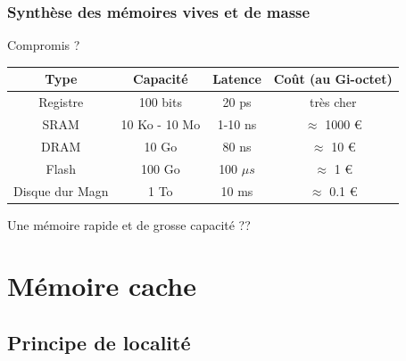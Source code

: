 \documentclass{beamer}
\begin{document}


\begin{frame}
\frametitle{Synthèse des mémoires vives et de masse}
\begin{block}{Compromis ?}
\begin{small}
\centering\begin{tabular}{cccc}
Type & Capacité & Latence & Coût (au  Gi-octet) \\
\hline
Registre & 100 bits & 20 ps & très cher\\
SRAM & 10 Ko - 10 Mo & 1-10 ns & $\approx$ 1000 \euro\\
DRAM & 10 Go & 80 ns & $\approx$ 10 \euro\\
\cline{2-3}
Flash & 100 Go & 100 $\mu s$& $\approx$ 1 \euro\\
Disque dur Magn & 1 To & 10 ms & $\approx$ 0.1 \euro
\end{tabular}
\end{small}
\end{block}
Une mémoire rapide et de grosse capacité ??
\end{frame}

\section{Mémoire cache}

\subsection{Principe de localité}
\end{document}
